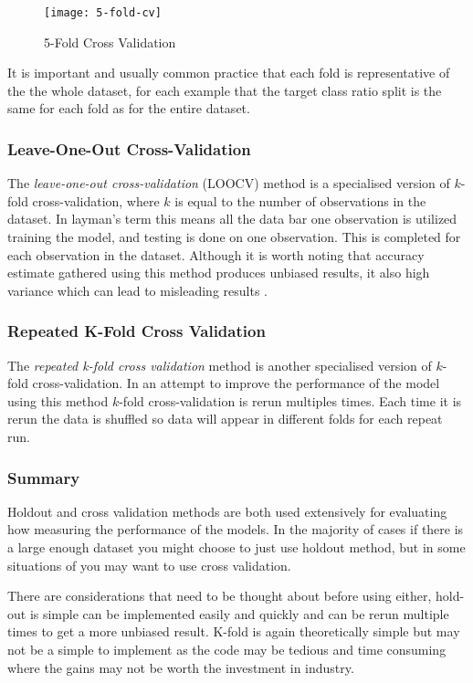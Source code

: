 \begin{figure}[H]
	\texttt{[image: 5-fold-cv]}
	\caption{5-Fold Cross Validation}
	\label{fig:5-fold-cv}
\end{figure}

It is important and usually common practice that each fold is representative of the the whole dataset, for each example that the target class ratio split is the same for each fold as for the entire dataset. 

\subsubsection{Leave-One-Out Cross-Validation}
The \textit{leave-one-out cross-validation} (LOOCV) method is a specialised version of $k$-fold cross-validation, where $k$ is equal to the number of observations in the dataset. In layman's term this means all the data bar one observation is utilized training the model, and testing is done on one observation. This is completed for each observation in the dataset. Although it is worth noting that accuracy estimate gathered using this method produces unbiased results, it also high variance which can lead to misleading results \citep{refaeilzadeh_cross-validation_2009}.
 

\subsubsection{Repeated K-Fold Cross Validation}
The \textit{repeated k-fold cross validation} method is another specialised version of $k$-fold cross-validation. In an attempt to improve the performance of the model using this method $k$-fold cross-validation is rerun multiples times. Each time it is rerun the data is shuffled so data will appear in different folds for each repeat run. 

\subsubsection{Summary}

Holdout and cross validation methods are both used extensively for evaluating how measuring the performance of the models. In the majority of cases if there is a large enough dataset you might choose to just use holdout method, but in some situations of you may want to use cross validation.

There are considerations that need to be thought about before using either, hold-out is simple can be implemented easily and quickly and can be rerun multiple times to get a more unbiased result. K-fold is again theoretically simple but may not be a simple to implement as the code may be tedious and time consuming where the gains may not be worth the investment in industry. 

